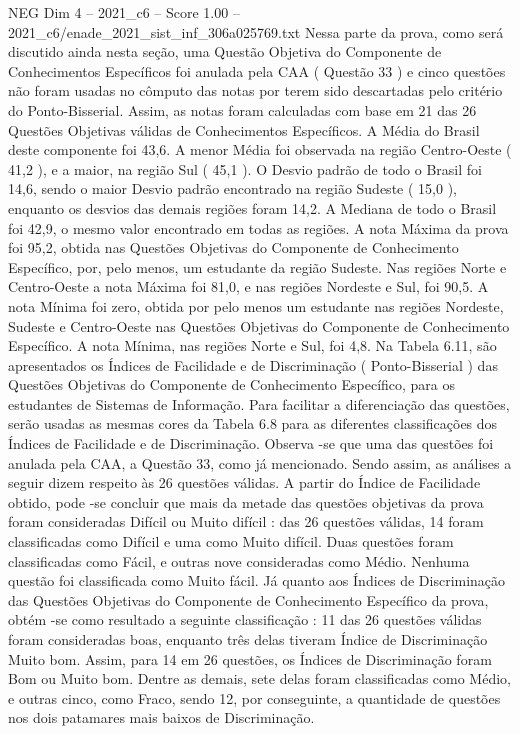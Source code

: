 \begin{textsample}{NEG Dim 4 – 2021\_c6 – Score 1.00 – 2021\_c6/enade\_2021\_sist\_inf\_306a025769.txt}
Nessa parte da prova, como será discutido ainda nesta seção, uma Questão Objetiva do Componente de Conhecimentos Específicos foi anulada pela CAA ( Questão 33 ) e cinco questões não foram usadas no cômputo das notas por terem sido descartadas pelo critério do Ponto-Bisserial.
Assim, as notas foram calculadas com base em 21 das 26 Questões Objetivas válidas de Conhecimentos Específicos.
A Média do Brasil deste componente foi 43,6.
A menor Média foi observada na região Centro-Oeste ( 41,2 ), e a maior, na região Sul ( 45,1 ).
O Desvio padrão de todo o Brasil foi 14,6, sendo o maior Desvio padrão encontrado na região Sudeste ( 15,0 ), enquanto os desvios das demais regiões foram 14,2.
A Mediana de todo o Brasil foi 42,9, o mesmo valor encontrado em todas as regiões.
A nota Máxima da prova foi 95,2, obtida nas Questões Objetivas do Componente de Conhecimento Específico, por, pelo menos, um estudante da região Sudeste.
Nas regiões Norte e Centro-Oeste a nota Máxima foi 81,0, e nas regiões Nordeste e Sul, foi 90,5.
A nota Mínima foi zero, obtida por pelo menos um estudante nas regiões Nordeste, Sudeste e Centro-Oeste nas Questões Objetivas do Componente de Conhecimento Específico.
A nota Mínima, nas regiões Norte e Sul, foi 4,8.
Na Tabela 6.11, são apresentados os Índices de Facilidade e de Discriminação ( Ponto-Bisserial ) das Questões Objetivas do Componente de Conhecimento Específico, para os estudantes de Sistemas de Informação.
Para facilitar a diferenciação das questões, serão usadas as mesmas cores da Tabela 6.8 para as diferentes classificações dos Índices de Facilidade e de Discriminação.
Observa -se que uma das questões foi anulada pela CAA, a Questão 33, como já mencionado.
Sendo assim, as análises a seguir dizem respeito às 26 questões válidas.
A partir do Índice de Facilidade obtido, pode -se concluir que mais da metade das questões objetivas da prova foram consideradas Difícil ou Muito difícil : das 26 questões válidas, 14 foram classificadas como Difícil e uma como Muito difícil.
Duas questões foram classificadas como Fácil, e outras nove consideradas como Médio.
Nenhuma questão foi classificada como Muito fácil.
Já quanto aos Índices de Discriminação das Questões Objetivas do Componente de Conhecimento Específico da prova, obtém -se como resultado a seguinte classificação : 11 das 26 questões válidas foram consideradas boas, enquanto três delas tiveram Índice de Discriminação Muito bom.
Assim, para 14 em 26 questões, os Índices de Discriminação foram Bom ou Muito bom.
Dentre as demais, sete delas foram classificadas como Médio, e outras cinco, como Fraco, sendo 12, por conseguinte, a quantidade de questões nos dois patamares mais baixos de Discriminação.

\end{textsample}
